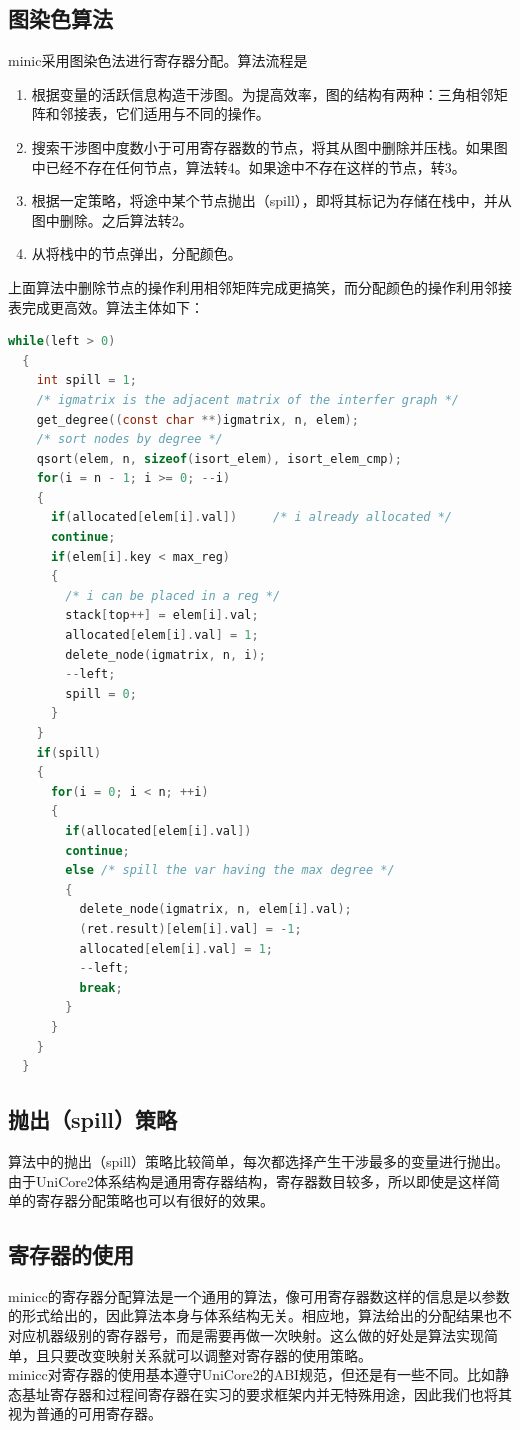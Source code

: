 \documentclass[12pt,a4paper,Flow]{report}
\begin{document}
\subsection{图染色算法}
minic采用图染色法进行寄存器分配。算法流程是
\begin{enumerate}
\item 根据变量的活跃信息构造干涉图。为提高效率，图的结构有两种：三角相邻矩阵和邻接表，它们适用与不同的操作。
\item 搜索干涉图中度数小于可用寄存器数的节点，将其从图中删除并压栈。如果图中已经不存在任何节点，算法转4。如果途中不存在这样的节点，转3。
\item 根据一定策略，将途中某个节点抛出（spill），即将其标记为存储在栈中，并从图中删除。之后算法转2。
\item 从将栈中的节点弹出，分配颜色。
\end{enumerate}
上面算法中删除节点的操作利用相邻矩阵完成更搞笑，而分配颜色的操作利用邻接表完成更高效。算法主体如下：
\begin{lstlisting}[language=c]
  while(left > 0)
  {
    int spill = 1;
    /* igmatrix is the adjacent matrix of the interfer graph */
    get_degree((const char **)igmatrix, n, elem);
    /* sort nodes by degree */
    qsort(elem, n, sizeof(isort_elem), isort_elem_cmp);
    for(i = n - 1; i >= 0; --i)
    {
      if(allocated[elem[i].val])     /* i already allocated */
      continue;
      if(elem[i].key < max_reg)
      {
        /* i can be placed in a reg */
        stack[top++] = elem[i].val;     
        allocated[elem[i].val] = 1;
        delete_node(igmatrix, n, i);
        --left;
        spill = 0;
      }
    }
    if(spill)
    {
      for(i = 0; i < n; ++i)
      {
        if(allocated[elem[i].val])
        continue;
        else /* spill the var having the max degree */
        {
          delete_node(igmatrix, n, elem[i].val);
          (ret.result)[elem[i].val] = -1;
          allocated[elem[i].val] = 1;
          --left;
          break;
        }
      }
    }
  }
\end{lstlisting}
\subsection{抛出（spill）策略}
算法中的抛出（spill）策略比较简单，每次都选择产生干涉最多的变量进行抛出。由于UniCore2体系结构是通用寄存器结构，寄存器数目较多，所以即使是这样简单的寄存器分配策略也可以有很好的效果。
\subsection{寄存器的使用}
minicc的寄存器分配算法是一个通用的算法，像可用寄存器数这样的信息是以参数的形式给出的，因此算法本身与体系结构无关。相应地，算法给出的分配结果也不对应机器级别的寄存器号，而是需要再做一次映射。这么做的好处是算法实现简单，且只要改变映射关系就可以调整对寄存器的使用策略。\\
minicc对寄存器的使用基本遵守UniCore2的ABI规范，但还是有一些不同。比如静态基址寄存器和过程间寄存器在实习的要求框架内并无特殊用途，因此我们也将其视为普通的可用寄存器。
\end{document}
